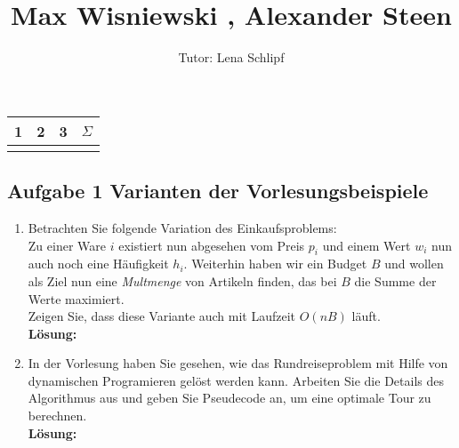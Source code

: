 \documentclass[11pt,a4paper,ngerman]{article}
\author{Tutor: Lena Schlipf}
\date{}
\title{Max Wisniewski , Alexander Steen}
\begin{document}

\maketitle
\thispagestyle{fancy}

\begin{flushright}
\begin{tabular}{|c|c|c||c|}
\hline
1&2&3&$\Sigma$\\
\hline \hline
\qquad \qquad & \qquad \qquad & \qquad \qquad & \qquad \qquad \\
\hline
\end{tabular}
\end{flushright}


\subsection*{Aufgabe 1 \mdseries Varianten der Vorlesungsbeispiele}

\begin{enumerate}[\bfseries (a)]



\item Betrachten Sie folgende Variation des Einkaufsproblems:\\
Zu einer Ware $i$ existiert nun abgesehen vom Preis $p_i$ und einem Wert $w_i$ nun auch noch eine Häufigkeit $h_i$. Weiterhin haben wir ein Budget $B$ und wollen als Ziel nun eine \emph{Multmenge} von Artikeln finden, das bei $B$ die Summe der Werte maximiert.\\
Zeigen Sie, dass diese Variante auch mit Laufzeit $O(nB)$ läuft.\\

\textbf{Lösung:}



\item In der Vorlesung haben Sie gesehen, wie das Rundreiseproblem mit Hilfe von dynamischen Programieren gelöst werden kann. Arbeiten Sie die Details des Algorithmus aus und geben Sie Pseudecode an, um eine optimale Tour zu berechnen.\\

\textbf{Lösung:}

\end{enumerate}
\end{document}
